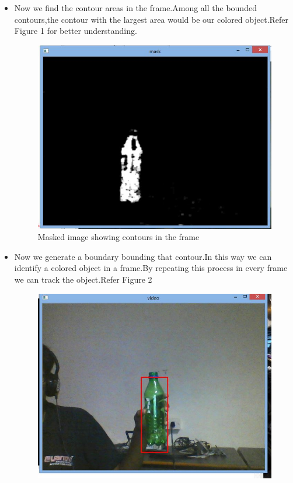 \documentclass[11pt,a4paper]{article}
\begin{document}
\begin{itemize}
	\item Now we find the contour areas in the frame.Among all the bounded contours,the contour with the largest area would be our colored object.Refer Figure 1 for better understanding.
		\begin{figure}[h!]
		\includegraphics[scale=0.4]{Capture2.jpg}	
		\centering
		\caption{Masked image showing contours in the frame}
		\end{figure}
	\item Now we generate a boundary bounding that contour.In this way we can identify a colored object in a frame.By repeating this process in every frame we can track the object.Refer Figure 2		
		\begin{figure}[h]
		\includegraphics[scale=0.4]{Capture1.jpg}	

\end{figure}
\end{itemize}
\end{document}
